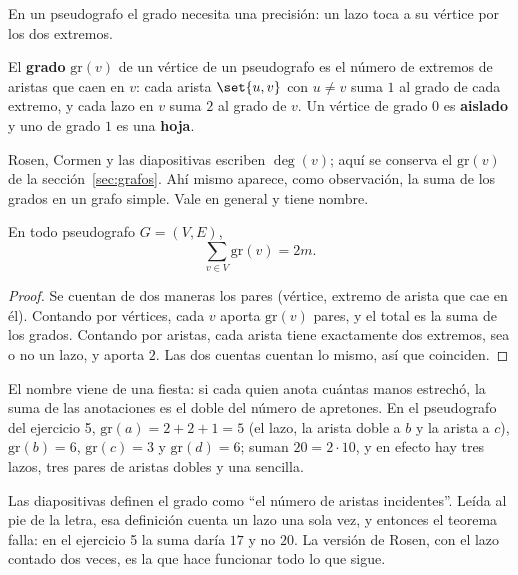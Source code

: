 \documentclass[11pt,letterpaper]{article}
\begin{document}
En un pseudografo el grado necesita una precisión: un lazo toca a su
vértice por los dos extremos.

\begin{definicion}[Grado]
  \label{def:grado-lazos}
  El \textbf{grado} $\text{gr}(v)$ de un vértice de un pseudografo es
  el número de extremos de aristas que caen en $v$: cada arista
  $\set{u, v}$ con $u \neq v$ suma $1$ al grado de cada extremo, y cada
  lazo en $v$ suma $2$ al grado de $v$. Un vértice de grado $0$ es
  \textbf{aislado} y uno de grado $1$ es una \textbf{hoja}.
\end{definicion}

Rosen, Cormen y las diapositivas escriben $\deg(v)$; aquí se conserva
el $\text{gr}(v)$ de la sección~\ref{sec:grafos}. Ahí mismo aparece,
como observación, la suma de los grados en un grafo simple. Vale en
general y tiene nombre.

\begin{teorema}
  \label{teo:apreton-manos}
  En todo pseudografo $G = (V, E)$,
  \[
    \sum_{v \in V} \text{gr}(v) = 2m .
  \]
\end{teorema}

\begin{proof}
  Se cuentan de dos maneras los pares (vértice, extremo de arista que
  cae en él). Contando por vértices, cada $v$ aporta $\text{gr}(v)$
  pares, y el total es la suma de los grados. Contando por aristas,
  cada arista tiene exactamente dos extremos, sea o no un lazo, y
  aporta $2$. Las dos cuentas cuentan lo mismo, así que coinciden.
\end{proof}

El nombre viene de una fiesta: si cada quien anota cuántas manos
estrechó, la suma de las anotaciones es el doble del número de
apretones. En el pseudografo del ejercicio 5,
$\text{gr}(a) = 2 + 2 + 1 = 5$ (el lazo, la arista doble a $b$ y la
arista a $c$), $\text{gr}(b) = 6$, $\text{gr}(c) = 3$ y
$\text{gr}(d) = 6$; suman $20 = 2 \cdot 10$, y en efecto hay tres
lazos, tres pares de aristas dobles y una sencilla.

\begin{ojo}
  Las diapositivas definen el grado como ``el número de aristas
  incidentes''. Leída al pie de la letra, esa definición cuenta un lazo
  una sola vez, y entonces el teorema falla: en el ejercicio 5 la suma
  daría $17$ y no $20$. La versión de Rosen, con el lazo contado dos
  veces, es la que hace funcionar todo lo que sigue.
\end{ojo}
\end{document}
